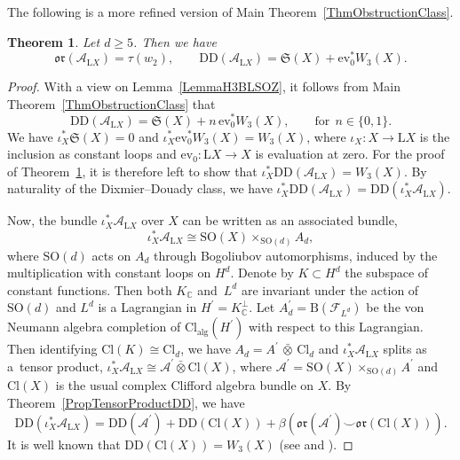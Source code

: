 \documentclass[10pt,a4paper]{amsart}
\numberwithin{equation}{section}
\newtheorem{Theorem}{Theorem}[section]
\newcommand{\C}{\mathbb{C}}
\newcommand{\B}{\mathrm{B}}
\newcommand{\A}{\mathcal{A}}
\newcommand{\Cl}{\mathrm{Cl}}
\newcommand{\SO}{\mathrm{SO}}
\renewcommand{\L}{\mathrm{L}}
\newcommand{\DD}{\mathrm{DD}}
\newcommand{\oclass}{\mathfrak{or}}
\begin{document}
The following is a more refined version of Main Theorem~\ref{ThmObstructionClass}.


\begin{Theorem} \label{ThmRepeatedMain}
Let $d\geq 5$. Then we have
\begin{equation*}
\oclass(\A_{\L X}) = \tau(w_2), \qquad \DD(\A_{\L X}) = \mathfrak{S}(X) + \mathrm{ev}_0^*W_3(X).
\end{equation*}
\end{Theorem}



\begin{proof}
With a view on Lemma~\ref{LemmaH3BLSOZ}, it follows from Main Theorem~\ref{ThmObstructionClass} that
\begin{equation*}
\DD(\mathcal{A}_{\L X}) = \mathfrak{S}(X) + n \, \mathrm{ev}_0^*W_3(X), \qquad \text{for}~~n \in \{0, 1\}.
\end{equation*}
We have $\iota_X^* \mathfrak{S}(X) = 0$ and $\iota_X^*\mathrm{ev}_0^*W_3(X) = W_3(X)$, where $\iota_X \colon X \to \L X$ is the inclusion as constant loops and $\mathrm{ev}_0 \colon \L X \to X$ is evaluation at zero.
For the proof of Theorem~\ref{ThmRepeatedMain}, it is therefore left to show that $\iota_X^* \DD(\mathcal{A}_{\L X}) = W_3(X)$.
By naturality of the Dixmier--Douady class, we have $\iota_X^* \DD(\mathcal{A}_{\L X}) = \DD(\iota_X^*\mathcal{A}_{\L X})$.

Now, the bundle $\iota_X^*\mathcal{A}_{\L X}$ over $X$ can be written as an associated bundle,
\begin{equation*}
 \iota_X^*\mathcal{A}_{\L X} \cong \SO(X) \times_{\SO(d)} A_d,
\end{equation*}
where $\SO(d)$ acts on $A_d$ through Bogoliubov automorphisms, induced by the multiplication with constant loops on $H^d$.
Denote by $K\subset H^d$ the subspace of constant functions.
Then both $K_\C$ and~$L^d$ are invariant under the action of $\SO(d)$ and $L^d$ is a Lagrangian in $H^\prime = K_\C^\perp$.
Let $A_d^\prime = \B(\mathcal{F}_{L^d})$ be the von Neumann algebra completion of $\Cl_{\mathrm{alg}}(H^\prime)$ with respect to this Lagrangian.
Then identifying $\Cl(K) \cong \Cl_d$, we have $A_d = A^\prime \,\bar{\otimes}\, \Cl_d$ and $\iota_X^*\mathcal{A}_{\L X}$ splits as a~tensor product, $\iota_X^*\mathcal{A}_{\L X} \cong \mathcal{A}^\prime \bar{\otimes}\Cl(X)$, where $\mathcal{A}^\prime = \SO(X) \times_{\SO(d)} A^\prime$ and $\Cl(X)$ is the usual complex Clifford algebra bundle on $X$.
By Theorem~\ref{PropTensorProductDD}, we have
\begin{equation*}
 \DD(\iota_X^*\mathcal{A}_{\L X}) = \DD(\mathcal{A}^\prime) + \DD(\Cl(X)) + \beta(\oclass(\mathcal{A}^\prime) \smile \oclass(\Cl(X))).
\end{equation*}
It is well known that $\DD(\Cl(X)) = W_3(X)$ (see \cite[Lemma~7]{DonovanKaroubi} and \cite{MathaiMelroseSingerProjectiveFamilies}).


\end{proof}
\end{document}
